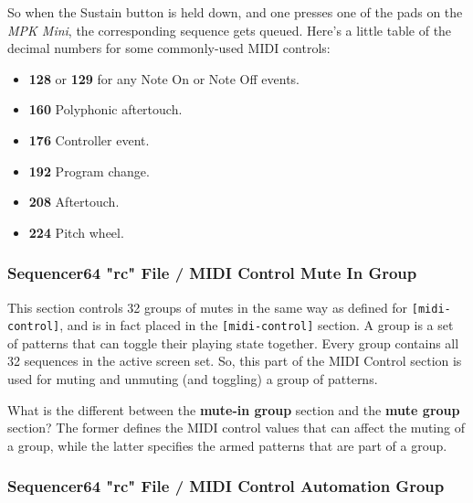    So when the Sustain button is held down, and one presses one of the pads
   on the \textsl{MPK Mini}, the corresponding sequence gets queued.
   Here's a little table of the decimal numbers for some commonly-used MIDI
   controls:

   \begin{itemize}
      \item \textbf{128} or \textbf{129} for any Note On or Note Off events.
      \item \textbf{160} Polyphonic aftertouch.
      \item \textbf{176} Controller event.
      \item \textbf{192} Program change.
      \item \textbf{208} Aftertouch.
      \item \textbf{224} Pitch wheel.
   \end{itemize}

\subsubsection{Sequencer64 "rc" File / MIDI Control Mute In Group}
\label{subsubsec:seq64_rc_file_midi_control_mute_in_group}

   This section controls 32 groups of mutes in the same way as 
   defined for \texttt{[midi-control]}, and is in fact placed in the
   \texttt{[midi-control]} section.
   A group is a set of patterns that can toggle their playing state
   together.  Every group contains all 32 sequences in the active screen set.
   So, this part of the MIDI Control section is used for muting and unmuting
   (and toggling) a group of patterns.

   What is the different between the \textbf{mute-in group}
   section and the \textbf{mute group} section?  The former defines the MIDI
   control values that can affect the muting of a group, while the latter
   specifies the armed patterns that are part of a group.

\subsubsection{Sequencer64 "rc" File / MIDI Control Automation Group}
\label{subsubsec:seq64_rc_file_midi_control_automation_group}


   \setcounter{ItemCounter}{0}      %

